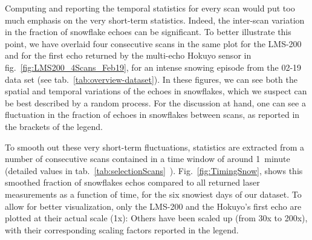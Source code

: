 Computing and reporting the temporal statistics for every scan would put too much emphasis on the very short-term statistics. Indeed, the inter-scan variation in the fraction of snowflake echoes can be significant. To better illustrate this point, we have overlaid four consecutive scans in the same plot for the LMS-200 and for the first echo returned by the multi-echo Hokuyo sensor in fig.~\ref{fig:LMS200_4Scans_Feb19}, for an intense snowing episode from the 02-19 data set (see tab.~\ref{tab:overview-dataset}). In these figures, we can see both the spatial and temporal variations of the echoes in snowflakes, which we suspect can be best described by a random process. For the discussion at hand, one can see a fluctuation in the fraction of echoes in snowflakes between scans, as reported in the brackets of the legend. 

To smooth out these very short-term fluctuations, statistics are extracted from a number of consecutive scans contained in a time window of around 1~minute (detailed values in tab.~\ref{tab:selectionScans}~). Fig.~\ref{fig:TimingSnow}, shows this smoothed fraction of snowflakes echos compared to all returned laser measurements as a function of time, for the six snowiest days of our dataset. To allow for better visualization, only the LMS-200 and the Hokuyo's first echo are plotted at their actual scale (1x): Others have been scaled up (from 30x to 200x), with their corresponding scaling factors reported in the legend. 

